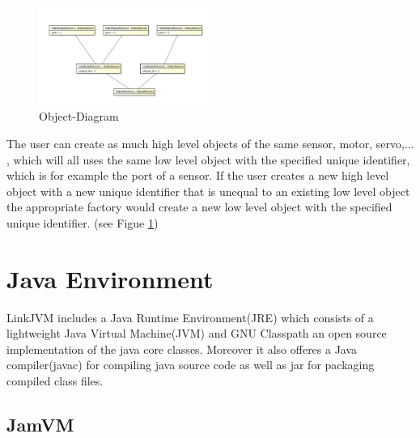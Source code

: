 \documentclass{juniorjournal}
\begin{document}
\begin{figure}[htbp]
\centering
\includegraphics[width=0.5\textwidth]{images/Object-Diagram.pdf}
\caption{Object-Diagram}
\label{fig:Object-Diagram}
\end{figure}

The user can create as much high level objects of the same sensor, motor, 
servo,... , which will all uses the same low level object with the specified 
unique identifier, which is for example the port of a sensor. If the user 
creates a new high level object with a new unique identifier that is unequal to 
an existing low level object the appropriate factory would 
create a new low level object with the specified unique identifier. (see Figue \ref{fig:Object-Diagram})
\section{Java Environment}
LinkJVM includes a Java Runtime Environment(JRE) which consists of a lightweight Java Virtual Machine(JVM) and GNU Classpath an open source implementation of the java core classes.
Moreover it also offeres a Java compiler(javac) for compiling java source code as well as jar for packaging compiled class files.
\subsection{JamVM}

\begin{thebibliography}{500} %

\end{thebibliography}
\end{document}

